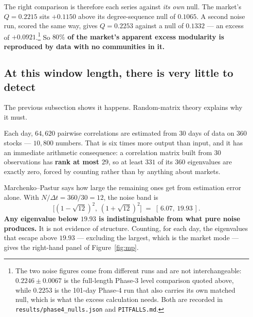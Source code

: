 \documentclass[11pt,a4paper]{article}
\newcommand{\Q}{Q}
\begin{document}
The right comparison is therefore each series against \emph{its own} null. The
market's $\Q=0.2215$ sits $+0.1150$ above its degree-sequence null of $0.1065$.
A second noise run, scored the same way, gives $\Q=0.2253$ against a null of
$0.1332$ --- an excess of $+0.0921$.\footnote{The two noise figures come from
different runs and are not interchangeable: $0.2246\pm0.0067$ is the
full-length Phase-3 level comparison quoted above, while $0.2253$ is the
101-day Phase-4 run that also carries its own matched null, which is what the
excess calculation needs. Both are recorded in
\texttt{results/phase4\_nulls.json} and \texttt{PITFALLS.md}.} So
\textbf{$80\%$ of the market's apparent excess modularity is reproduced by data
with no communities in it.}

\subsection{At this window length, there is very little to detect}

The previous subsection shows it happens. Random-matrix theory explains why it
must.

Each day, $64{,}620$ pairwise correlations are estimated from $30$ days of data
on $360$ stocks --- $10{,}800$ numbers. That is six times more output than
input, and it has an immediate arithmetic consequence: a correlation matrix
built from $30$ observations has \textbf{rank at most $29$}, so at least $331$
of its $360$ eigenvalues are exactly zero, forced by counting rather than by
anything about markets.

Marchenko--Pastur says how large the remaining ones get from estimation error
alone. With $N/\Delta t=360/30=12$, the noise band is
\[
  \big[(1-\sqrt{12})^2,\ (1+\sqrt{12})^2\big] \;=\; [\,6.07,\ 19.93\,].
\]
\textbf{Any eigenvalue below $19.93$ is indistinguishable from what pure noise
produces.} It is not evidence of structure. Counting, for each day, the
eigenvalues that escape above $19.93$ --- excluding the largest, which is the
market mode --- gives the right-hand panel of Figure~\ref{fig:mp}.
\end{document}
